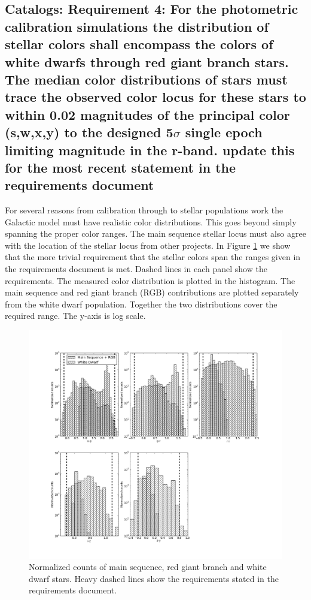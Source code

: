 \documentclass[]{article}
\begin{document}
{\subsection{Catalogs: Requirement 4: For the photometric calibration simulations
the distribution of stellar colors shall encompass the colors of white dwarfs through red giant branch stars.
The median color distributions of stars must trace the observed color locus for these stars to within 0.02 magnitudes
of the principal color (s,w,x,y) to the designed 5$\sigma$ single epoch limiting magnitude in the r-band.
{\bf update this for the most recent statement in the requirements document}}
For several reasons from calibration through to stellar populations work the Galactic model must have realistic color distributions.
This goes beyond simply spanning the proper color ranges.  The main sequence stellar locus must also agree with the location of the
stellar locus from other projects.  In Figure \ref{fig:starcolorspan} we show that the more trivial requirement that the stellar
colors span the ranges given in the requirements document is met.  Dashed lines in each panel show the requirements.  The measured
color distribution is plotted in the histogram.  The main sequence and red giant branch (RGB) contributions are plotted separately from
the white dwarf population.  Together the two distributions cover the required range.  The y-axis is log scale.
\begin{figure}[H]
\centering
\includegraphics[width=5in]{validation_figures/star_lsst_color_hist.png}
\caption{Normalized counts of main sequence, red giant branch and white dwarf stars.  Heavy dashed lines show the requirements stated in the requirements document.\label{fig:starcolorspan}}
\end{figure}

}
\end{document}
